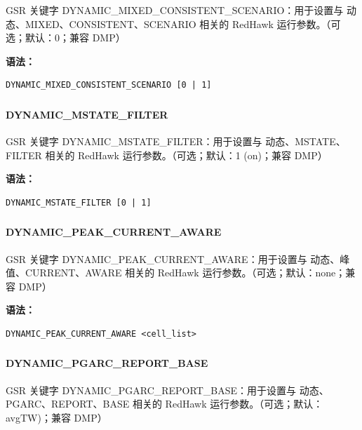 GSR 关键字 DYNAMIC_MIXED_CONSISTENT_SCENARIO：用于设置与 动态、MIXED、CONSISTENT、SCENARIO 相关的 RedHawk 运行参数。（可选；默认：0；兼容 DMP）

\textbf{语法：}
\begin{lstlisting}
DYNAMIC_MIXED_CONSISTENT_SCENARIO [0 | 1]
\end{lstlisting}

\subsubsection{}
\paragraph*{DYNAMIC_MSTATE_FILTER}

GSR 关键字 DYNAMIC_MSTATE_FILTER：用于设置与 动态、MSTATE、FILTER 相关的 RedHawk 运行参数。（可选；默认：1 (on)；兼容 DMP）

\textbf{语法：}
\begin{lstlisting}
DYNAMIC_MSTATE_FILTER [0 | 1]
\end{lstlisting}

\subsubsection{}
\paragraph*{DYNAMIC_PEAK_CURRENT_AWARE}

GSR 关键字 DYNAMIC_PEAK_CURRENT_AWARE：用于设置与 动态、峰值、CURRENT、AWARE 相关的 RedHawk 运行参数。（可选；默认：none；兼容 DMP）

\textbf{语法：}
\begin{lstlisting}
DYNAMIC_PEAK_CURRENT_AWARE <cell_list>
\end{lstlisting}

\subsubsection{}
\paragraph*{DYNAMIC_PGARC_REPORT_BASE}

GSR 关键字 DYNAMIC_PGARC_REPORT_BASE：用于设置与 动态、PGARC、REPORT、BASE 相关的 RedHawk 运行参数。（可选；默认：avgTW)；兼容 DMP）


